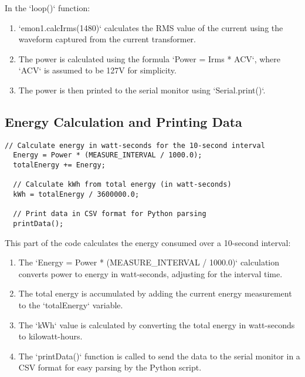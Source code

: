 In the `loop()` function:
\begin{enumerate}
    \item `emon1.calcIrms(1480)` calculates the RMS value of the current using the waveform captured from the current transformer.
    \item The power is calculated using the formula `Power = Irms * ACV`, where `ACV` is assumed to be 127V for simplicity.
    \item The power is then printed to the serial monitor using `Serial.print()`.
\end{enumerate}


\subsection{Energy Calculation and Printing Data}
\begin{lstlisting}[style=Arduino]
  // Calculate energy in watt-seconds for the 10-second interval
  Energy = Power * (MEASURE_INTERVAL / 1000.0);   
  totalEnergy += Energy;                          

  // Calculate kWh from total energy (in watt-seconds)
  kWh = totalEnergy / 3600000.0;  

  // Print data in CSV format for Python parsing
  printData();
\end{lstlisting}

This part of the code calculates the energy consumed over a 10-second interval:
\begin{enumerate}
    \item The `Energy = Power * (MEASURE\_INTERVAL / 1000.0)` calculation converts power to energy in watt-seconds, adjusting for the interval time.
    \item The total energy is accumulated by adding the current energy measurement to the `totalEnergy` variable.
    \item The `kWh` value is calculated by converting the total energy in watt-seconds to kilowatt-hours.
    \item The `printData()` function is called to send the data to the serial monitor in a CSV format for easy parsing by the Python script.
\end{enumerate}


